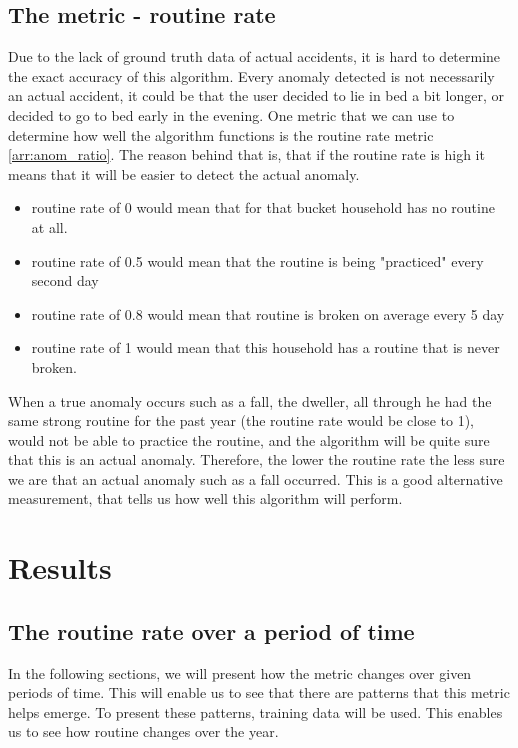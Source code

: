 \subsection{The metric - routine rate}

Due to the lack of ground truth data of actual accidents, it is hard to determine the 
exact accuracy of this algorithm. Every anomaly detected is not necessarily an 
actual accident, it could be that the user decided to lie in bed a bit longer, or decided to go to bed early in the evening.
One metric that we can use to determine how well the algorithm functions is the routine rate metric \ref{arr:anom_ratio}.
The reason behind that is, that if the routine rate is high it means that it will be easier to detect the actual anomaly.

\begin{itemize}
	\item routine rate of 0 would mean that for that bucket household has no routine at all.
    \item routine rate of 0.5 would mean that the routine is being "practiced" every second day
    \item routine rate of 0.8 would mean that routine is broken on average every 5 day
    \item routine rate of 1 would mean that this household has a routine that is never broken. 
\end{itemize}

When a true anomaly occurs such as a fall, the dweller, all through he had the same strong routine for the past year (the routine rate would be close to 1), would not be able to practice the routine, and the algorithm will be quite sure that this is an actual anomaly.
Therefore, the lower the routine rate the less sure we are that an actual anomaly such as a fall occurred.
This is a good alternative measurement, that tells us how well this algorithm will perform. 

\section{Results} 

\subsection{The routine rate over a period of time}

In the following sections, we will present how the metric changes over given periods of time.
This will enable us to see that there are patterns that this metric helps emerge. 
To present these patterns, training data will be used. 
This enables us to see how routine changes over the year. 


